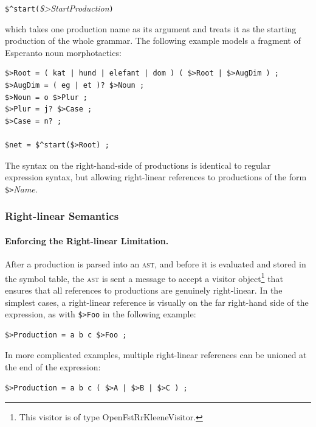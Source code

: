\documentclass[letterpaper,12pt]{article}
\newcommand{\acro}{\textsc}
\begin{document}
\vspace{0.5cm}
\verb!$^start(!\emph{\$>StartProduction}\verb!)!
\vspace{0.5cm}

\noindent
which takes one production
name as its argument and treats it as the starting production of the whole
grammar.  The following example models a fragment of Esperanto noun morphotactics:

\begin{Verbatim}[fontsize=\small]
$>Root = ( kat | hund | elefant | dom ) ( $>Root | $>AugDim ) ;
$>AugDim = ( eg | et )? $>Noun ;
$>Noun = o $>Plur ;
$>Plur = j? $>Case ;
$>Case = n? ;

$net = $^start($>Root) ;
\end{Verbatim}

\noindent
The syntax on the right-hand-side of productions is identical to regular
expression syntax, but allowing right-linear references to productions of the form
\verb!$>!\emph{Name}.

\subsubsection{Right-linear Semantics}


\paragraph{Enforcing the Right-linear Limitation.}

After a production is parsed into an
\acro{ast}, and before it is evaluated and stored in the symbol table, the
\acro{ast} is sent a message to accept a visitor object\footnote{This
visitor is of type
OpenFstRrKleeneVisitor.} that ensures that
all references to productions are genuinely right-linear.  In the simplest cases,
a right-linear reference is visually on the far right-hand side of the
expression, as with \verb!$>Foo! in the following example:

\begin{Verbatim}[fontsize=\small]
$>Production = a b c $>Foo ;
\end{Verbatim}

\noindent
In more complicated examples, multiple right-linear references can be unioned 
at the end of the expression:

\begin{Verbatim}[fontsize=\small]
$>Production = a b c ( $>A | $>B | $>C ) ;
\end{Verbatim}
\end{document}
